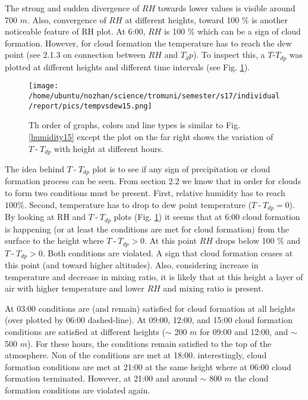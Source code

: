 \documentclass[a4paper,12pt]{article}
\numberwithin{equation}{section} %
\begin{document}
The strong and sudden divergence of $RH$ towards lower values is visible around $700$ $m$. Also, convergence of $RH$ at different heights, toward 100 $\%$ is another noticeable feature of RH plot. At 6:00, $RH$ is 100 $\%$ which can be a sign of cloud formation. However, for cloud formation the temperature has to reach the dew point (see 2.1.3 on connection between $RH$ and $T_dp$). To inspect this, a $T$-$T_{dp}$ was plotted at different heights and different time intervals (see Fig. \ref{tempvsdew15}).

\begin{figure}[bhp]
\texttt{[image: /home/ubuntu/nozhan/science/tromuni/semester/s17/individual/report/pics/tempvsdew15.png]}
\caption{Th order of graphs, colors and line types is similar to Fig. \ref{humidity15} except the plot on the far right shows the variation of $T\:$-$\:T_{dp}$ with height at different hours.}
\label{tempvsdew15}
\end{figure}

The idea behind $T\:$-$\:T_{dp}$ plot is to see if any sign of precipitation or cloud formation process can be seen. From section 2.2 we know that in order for clouds to form two conditions must be present. First, relative humidity has to reach $100 \%$. Second, temperature has to drop to dew point temperature ($T\:$-$\:T_{dp} = 0$). By looking at RH and $T\:$-$\:T_{dp}$ plots (Fig. \ref{tempvsdew15}) it seems that at 6:00 cloud formation is happening (or at least the conditions are met for cloud formation) from the surface to the height where $T\:$-$\:T_{dp} > 0$. At this point $RH$ drops below 100 $\%$ and $T\:$-$\:T_{dp} > 0$. Both conditions are violated. A sign that cloud formation ceases at this point (and toward higher altitudes). Also, considering increase in temperature and decrease in mixing ratio, it is likely that at this height a layer of air with higher temperature and lower $RH$ and mixing ratio is present.

At 03:00 conditions are (and remain) satisfied for cloud formation at all heights (over plotted by 06:00 dashed-line). At 09:00, 12:00, and 15:00 cloud formation conditions are satisfied at different heights ($\sim$ 200 $m$ for 09:00 and 12:00, and $\sim$ 500 $m$). For these hours, the conditions remain satisfied to the top of the atmosphere. Non of the conditions are met at 18:00. interestingly, cloud formation conditions are met at 21:00 at the same height where at 06:00 cloud formation terminated. However, at 21:00 and around $\sim$ 800 $m$ the cloud formation conditions are violated again.
\end{document}
